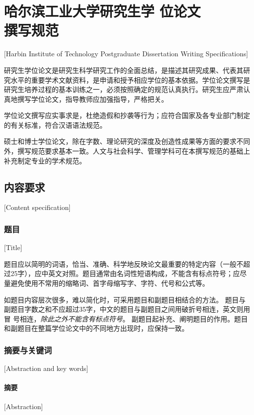 

\chapter[哈尔滨工业大学研究生学位论文撰写规范]{哈尔滨工业大学研究生学
  位论文\protect\\撰写规范}[Harbin Institute of Technology Postgraduate Dissertation Writing Specifications]

研究生学位论文是研究生科学研究工作的全面总结，是描述其研究成果、代表其研究水平的重要学术文献资料，是申请和授予相应学位的基本依据。学位论文撰写是研究生培养过程的基本训练之一，必须按照确定的规范认真执行。研究生应严肃认真地撰写学位论文，指导教师应加强指导，严格把关。

学位论文撰写应实事求是，杜绝造假和抄袭等行为；应符合国家及各专业部门制定的有关标准，符合汉语语法规范。

硕士和博士学位论文，除在字数、理论研究的深度及创造性成果等方面的要求不同外，撰写规范要求基本一致。人文与社会科学、管理学科可在本撰写规范的基础上补充制定专业的学术规范。

\section{内容要求}[Content specification]

\subsection{题目}[Title]

题目应以简明的词语，恰当、准确、科学地反映论文最重要的特定内容（一般不超过25字），应中英文对照。题目通常由名词性短语构成，不能含有标点符号；应尽量避免使用不常用的缩略词、首字母缩写字、字符、代号和公式等。

如题目内容层次很多，难以简化时，可采用题目和副题目相结合的方法。
题目与副题目字数之和不应超过35字，中文的题目与副题目之间用破折号相连，英文则用冒
号相连，\emph{除此之外不能含有标点符号}。
副题目起补充、阐明题目的作用。题目和副题目在整篇学位论文中的不同地方出现时，应保持一致。

\subsection{摘要与关键词}[Abstraction and key words]
\subsubsection{摘要}[Abstraction]

